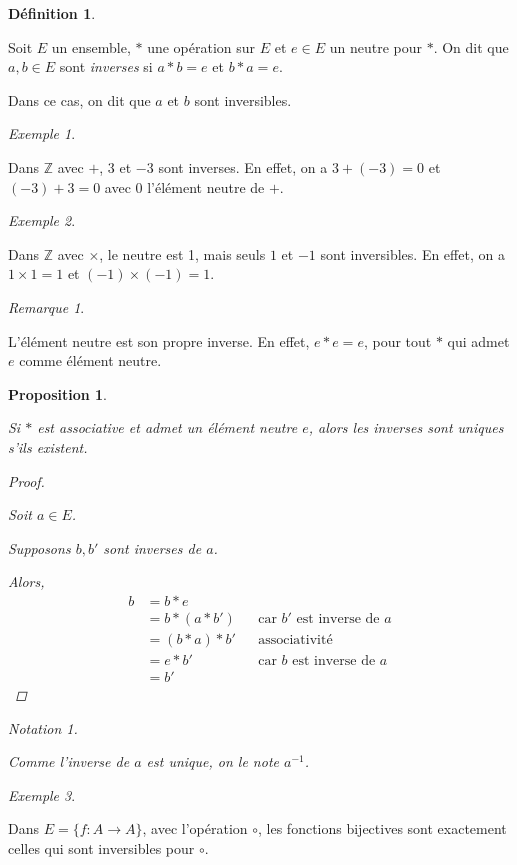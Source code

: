 \documentclass{report}
\newcommand*{\entiers}{\mathbb{Z}}
\newtheorem*{prop}{Proposition}
\theoremstyle{definition}
\newtheorem*{defin}{D\'efinition}
\theoremstyle{remark}
\newtheorem*{exem}{Exemple}
\newtheorem*{nota}{Notation}
\newtheorem*{rema}{Remarque}
\begin{document}
	\begin{defin}
		~

		Soit $E$ un ensemble, $*$ une op\'eration sur $E$ et $e \in E$ un neutre pour $*$. On dit que $a,b \in E$ sont \emph{inverses} si $a*b=e$ et $b*a=e$.

		Dans ce cas, on dit que $a$ et $b$ sont inversibles.
	\end{defin}
	\begin{exem}
		~

		Dans $\entiers$ avec $+$, $3$ et $-3$ sont inverses. En effet, on a $3+(-3)=0$ et $(-3)+3=0$ avec $0$ l'\'el\'ement neutre de $+$.
	\end{exem}
	\begin{exem}
		~

		Dans $\entiers$ avec $\times$, le neutre est 1, mais seuls $1$ et $-1$ sont inversibles. En effet, on a $1 \times 1=1$ et $(-1) \times (-1)=1$.
	\end{exem}
	\begin{rema}
		~

		L'\'el\'ement neutre est son propre inverse. En effet, $e*e=e$, pour tout $*$ qui admet $e$ comme \'el\'ement neutre.
	\end{rema}
	\begin{prop}
		~

		Si $*$ est associative et admet un \'el\'ement neutre $e$, alors les inverses sont uniques s'ils existent.
		\begin{proof}~

			Soit $a \in E$.

			Supposons $b,b'$ sont inverses de $a$.

			Alors,
			\begin{align*}
				b&=b*e\\
				&=b*(a*b')&&\text{car $b'$ est inverse de $a$}\\
				&=(b*a)*b'&&\text{associativit\'e}\\
				&=e*b'&&\text{car $b$ est inverse de $a$}\\
				&=b'
			\end{align*}
		\end{proof}
		\begin{nota}
			~

			Comme l'inverse de $a$ est unique, on le note $a^{-1}$.
		\end{nota}
	\end{prop}
	\begin{exem}
		~

		Dans $E=\{f:A \to A\}$, avec l'op\'eration $\circ$, les fonctions bijectives sont exactement celles qui sont inversibles pour $\circ$.
	\end{exem}
\end{document}

